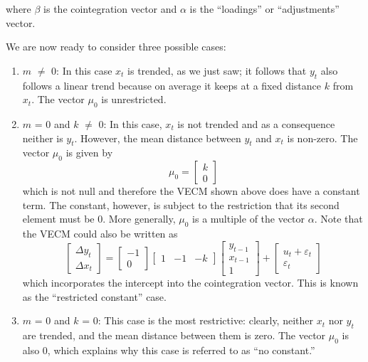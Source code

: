 %	
where $\beta$ is the cointegration vector and $\alpha$ is the
``loadings'' or ``adjustments'' vector.
     
We are now ready to consider three possible cases:
    
\begin{enumerate}
\item $m$ $\ne$ 0: In this case $x_t$ is trended, as we just saw; it
  follows that $y_t$ also follows a linear trend because on average it
  keeps at a fixed distance $k$ from $x_t$. The vector $\mu_0$ is
  unrestricted.
	
\item $m$ = 0 and $k$ $\ne$ 0: In this case, $x_t$ is not trended and
  as a consequence neither is $y_t$. However, the mean distance
  between $y_t$ and $x_t$ is non-zero. The vector
  $\mu_0$ is given by
%	  
  \[
  \mu_0 = \left[ \begin{array}{c} k \\ 0 \end{array} \right]
  \]
%	    
  which is not null and therefore the VECM shown above does have a
  constant term. The constant, however, is subject to the restriction
  that its second element must be 0. More generally,
  $\mu_0$ is a multiple of the vector $\alpha$. Note
  that the VECM could also be written as
%	  
  \[
  \left[ \begin{array}{c} \Delta y_t \\ \Delta x_t \end{array} \right]
  = \left[ \begin{array}{r} -1 \\ 0 \end{array} \right] \left[
    \begin{array}{rrr} 1 & -1 & -k \end{array} \right] \left[
    \begin{array}{c} y_{t-1} \\ x_{t-1} \\ 1 \end{array} \right] +
  \left[ \begin{array}{c} u_t + \varepsilon_t \\ \varepsilon_t
    \end{array} \right]
  \]
%	   
  which incorporates the intercept into the cointegration vector. This
  is known as the ``restricted constant'' case.
	
\item $m$ = 0 and $k$ = 0: This case is the most restrictive: clearly,
  neither $x_t$ nor $y_t$ are trended, and the mean distance between
  them is zero. The vector $\mu_0$ is also 0, which explains why this
  case is referred to as ``no constant.''
	
\end{enumerate}

